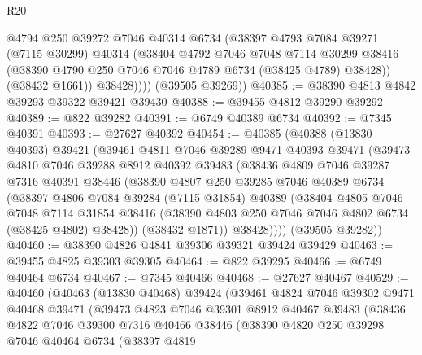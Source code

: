 \begin{lexlean}{R20}
\begin{coremodule}
{              @4794
              @250
              @39272
              @7046
              @40314
              @6734
              (@38397
                @4793
                @7084
                @39271
                (@7115 @30299)
                @40314
                (@38404
                  @4792
                  @7046
                  @7048
                  @7114
                  @30299
                  @38416
                  (@38390 @4790 @250 @7046 @7046 @4789 @6734 (@38425 @4789) @38428))
                (@38432 @1661))
              @38428))))
      (@39505 @39269))
@40385 := @38390 @4813 @4842 @39293 @39322 @39421 @39430
@40388 := @39455 @4812 @39290 @39292
@40389 := @822 @39282
@40391 := @6749 @40389 @6734
@40392 := @7345 @40391
@40393 := @27627 @40392
@40454 := @40385
    (@40388
      (@13830 @40393)
      @39421
      (@39461
        @4811
        @7046
        @39289
        @9471
        @40393
        @39471
        (@39473
          @4810
          @7046
          @39288
          @8912
          @40392
          @39483
          (@38436
            @4809
            @7046
            @39287
            @7316
            @40391
            @38446
            (@38390
              @4807
              @250
              @39285
              @7046
              @40389
              @6734
              (@38397
                @4806
                @7084
                @39284
                (@7115 @31854)
                @40389
                (@38404
                  @4805
                  @7046
                  @7048
                  @7114
                  @31854
                  @38416
                  (@38390 @4803 @250 @7046 @7046 @4802 @6734 (@38425 @4802) @38428))
                (@38432 @1871))
              @38428))))
      (@39505 @39282))
@40460 := @38390 @4826 @4841 @39306 @39321 @39424 @39429
@40463 := @39455 @4825 @39303 @39305
@40464 := @822 @39295
@40466 := @6749 @40464 @6734
@40467 := @7345 @40466
@40468 := @27627 @40467
@40529 := @40460
    (@40463
      (@13830 @40468)
      @39424
      (@39461
        @4824
        @7046
        @39302
        @9471
        @40468
        @39471
        (@39473
          @4823
          @7046
          @39301
          @8912
          @40467
          @39483
          (@38436
            @4822
            @7046
            @39300
            @7316
            @40466
            @38446
            (@38390
              @4820
              @250
              @39298
              @7046
              @40464
              @6734
              (@38397
                @4819
}
\end{coremodule}
\end{lexlean}
